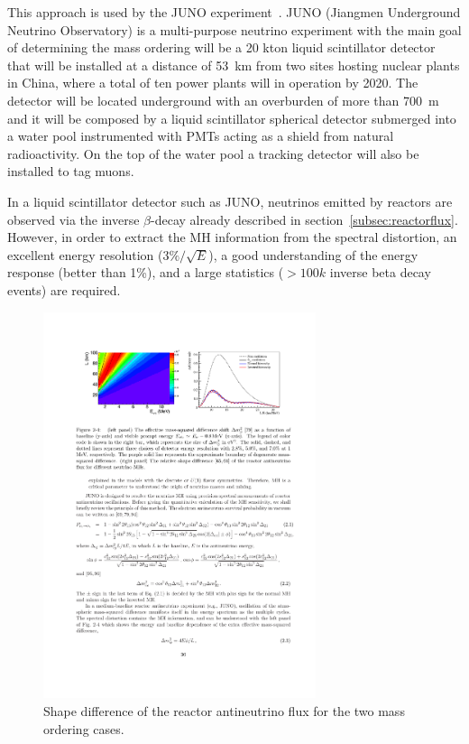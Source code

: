 This approach is used by the JUNO experiment~\cite{}. JUNO (Jiangmen Underground Neutrino Observatory) is a multi-purpose neutrino experiment with the main goal of determining the mass ordering will be a 20 kton liquid scintillator detector that will be installed at a distance of 53~km from two sites hosting nuclear plants in China, where a total of ten power plants will in operation by 2020. The detector will be located underground with an overburden of more than 700~m and it will be composed by a liquid scintillator spherical detector submerged into a water pool instrumented with PMTs acting as a shield from natural radioactivity. On the top of the water pool a tracking detector will also be installed to tag muons. 

In a liquid scintillator detector such as JUNO, neutrinos emitted by reactors are observed via the inverse $\beta$-decay already described in section~\ref{subsec:reactorflux}. 
However, in order to extract the MH information from the spectral distortion, an excellent energy resolution ($3\%/ \sqrt{E}$), a good understanding of the energy response (better than 1\%), and a large statistics ($>100k$ inverse beta decay events) are required.
 
\begin{figure} [h!]
\begin{center}
\includegraphics[width=8cm]{figures/JUNO_spectrum.pdf}
\caption{\label{fig:junospectrum} Shape difference of the reactor antineutrino flux for the two mass ordering cases.}
\end{center}
\end{figure}

